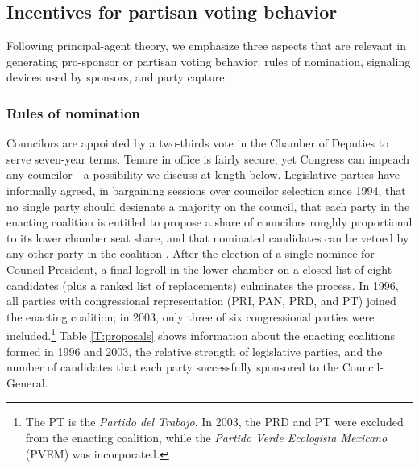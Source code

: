 \documentclass[12 pt, letter]{article}
\begin{document}
\subsection{Incentives for partisan voting behavior}
Following principal-agent theory, we emphasize three aspects that
are relevant in generating pro-sponsor or partisan voting behavior:
rules of nomination, signaling devices used by sponsors, and party
capture.

\subsubsection{Rules of nomination}
Councilors are appointed by a two-thirds vote in the Chamber of
Deputies to serve seven-year terms.  Tenure in office is fairly
secure, yet Congress can impeach any councilor---a possibility we
discuss at length below.  Legislative parties have informally
agreed, in bargaining sessions over councilor selection since 1994,
that no single party should designate a majority on the council,
that each party in the enacting coalition is entitled to propose a
share of councilors roughly proportional to its lower chamber seat
share, and that nominated candidates can be vetoed by any other
party in the coalition \citep{Alcocer1995, Schedler2000a}. After the
election of a single nominee for Council President, a final logroll
in the lower chamber on a closed list of eight candidates (plus a
ranked list of replacements) culminates the process.  In 1996, all
parties with congressional representation (PRI, PAN, PRD, and PT)
joined the enacting coalition; in 2003, only three of six
congressional parties were included.\footnote{The PT is the
\emph{Partido del Trabajo}.  In 2003, the PRD and PT were excluded
from the enacting coalition, while the \emph{Partido Verde
Ecologista Mexicano} (PVEM) was incorporated.}  Table
\ref{T:proposals} shows information about the enacting coalitions
formed in 1996 and 2003, the relative strength of legislative
parties, and the number of candidates that each party successfully
sponsored to the Council-General.
\end{document}
